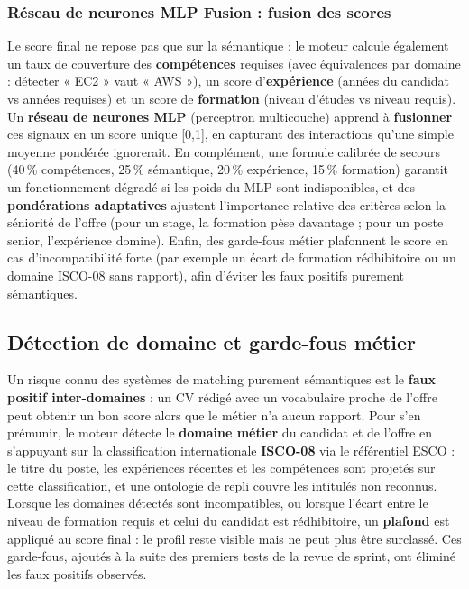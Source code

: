 \documentclass[12pt,a4paper]{report}
\begin{document}
\subsubsection{Réseau de neurones MLP Fusion : fusion des scores}

Le score final ne repose pas que sur la sémantique : le moteur calcule également un taux de couverture des \textbf{compétences} requises (avec équivalences par domaine : détecter « EC2 » vaut « AWS »), un score d'\textbf{expérience} (années du candidat vs années requises) et un score de \textbf{formation} (niveau d'études vs niveau requis). Un \textbf{réseau de neurones MLP} (perceptron multicouche) apprend à \textbf{fusionner} ces signaux en un score unique [0,1], en capturant des interactions qu'une simple moyenne pondérée ignorerait. En complément, une formule calibrée de secours (40\,\% compétences, 25\,\% sémantique, 20\,\% expérience, 15\,\% formation) garantit un fonctionnement dégradé si les poids du MLP sont indisponibles, et des \textbf{pondérations adaptatives} ajustent l'importance relative des critères selon la séniorité de l'offre (pour un stage, la formation pèse davantage ; pour un poste senior, l'expérience domine). Enfin, des garde-fous métier plafonnent le score en cas d'incompatibilité forte (par exemple un écart de formation rédhibitoire ou un domaine ISCO-08 sans rapport), afin d'éviter les faux positifs purement sémantiques.

\subsection{Détection de domaine et garde-fous métier}

Un risque connu des systèmes de matching purement sémantiques est le \textbf{faux positif inter-domaines} : un CV rédigé avec un vocabulaire proche de l'offre peut obtenir un bon score alors que le métier n'a aucun rapport. Pour s'en prémunir, le moteur détecte le \textbf{domaine métier} du candidat et de l'offre en s'appuyant sur la classification internationale \textbf{ISCO-08} via le référentiel ESCO : le titre du poste, les expériences récentes et les compétences sont projetés sur cette classification, et une ontologie de repli couvre les intitulés non reconnus. Lorsque les domaines détectés sont incompatibles, ou lorsque l'écart entre le niveau de formation requis et celui du candidat est rédhibitoire, un \textbf{plafond} est appliqué au score final : le profil reste visible mais ne peut plus être surclassé. Ces garde-fous, ajoutés à la suite des premiers tests de la revue de sprint, ont éliminé les faux positifs observés.
\end{document}
